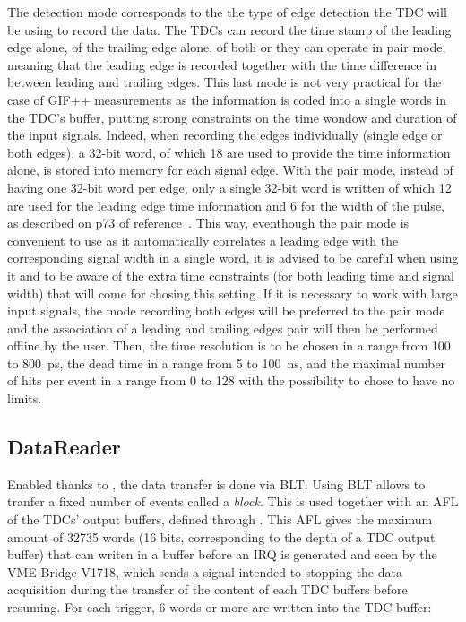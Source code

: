	The detection mode corresponds to the the type of edge detection the TDC will be using to record the data. The TDCs can record the time stamp of the leading edge alone, of the trailing edge alone, of both or they can operate in pair mode, meaning that the leading edge is recorded together with the time difference in between leading and trailing edges. This last mode is not very practical for the case of GIF++ measurements as the information is coded into a single words in the TDC's buffer, putting strong constraints on the time wondow and duration of the input signals. Indeed, when recording the edges individually (single edge or both edges), a 32-bit word, of which 18 are used to provide the time information alone, is stored into memory for each signal edge. With the pair mode, instead of having one 32-bit word per edge, only a single 32-bit word is written of which 12 are used for the leading edge time information and 6 for the width of the pulse, as described on p73 of reference~\cite{V1190AMUT}. This way, eventhough the pair mode is convenient to use as it automatically correlates a leading edge with the corresponding signal width in a single word, it is advised to be careful when using it and to be aware of the extra time constraints (for both leading time and signal width) that will come for chosing this setting. If it is necessary to work with large input signals, the mode recording both edges will be preferred to the pair mode and the association of a leading and trailing edges pair will then be performed offline by the user. Then, the time resolution is to be chosen in a range from 100 to \SI{800}{ps}, the dead time in a range from 5 to \SI{100}{ns}, and the maximal number of hits per event in a range from 0 to 128 with the possibility to chose to have no limits.
	
	\subsection{DataReader}
	\label{app1:ssec:DataReader}
	
	Enabled thanks to , the data transfer is done via \acf{BLT}. Using BLT allows to tranfer a fixed number of events called a \textit{block}. This is used together with an \acf{AFL} of the TDCs' output buffers, defined through . This AFL gives the maximum amount of 32735 words (16 bits, corresponding to the depth of a TDC output buffer) that can writen in a buffer before an \acf{IRQ} is generated and seen by the VME Bridge V1718, which sends a  signal intended to stopping the data acquisition during the transfer of the content of each TDC buffers before resuming. For each trigger, 6 words or more are written into the TDC buffer:
	
